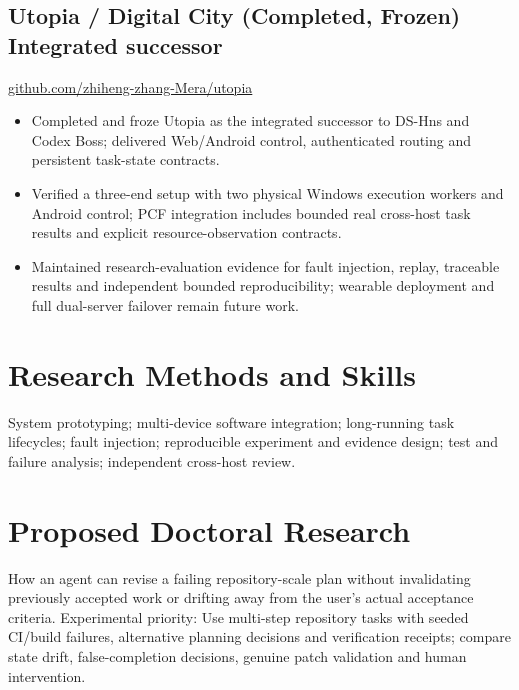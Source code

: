 \documentclass[10pt,a4paper]{article}
\begin{document}
\subsection*{Utopia / Digital City (Completed, Frozen) \hfill \small Integrated successor}
\href{https://github.com/zhiheng-zhang-Mera/utopia}{github.com/zhiheng-zhang-Mera/utopia}
\begin{itemize}
\item Completed and froze Utopia as the integrated successor to DS-Hns and Codex Boss; delivered Web/Android control, authenticated routing and persistent task-state contracts.
\item Verified a three-end setup with two physical Windows execution workers and Android control; PCF integration includes bounded real cross-host task results and explicit resource-observation contracts.
\item Maintained research-evaluation evidence for fault injection, replay, traceable results and independent bounded reproducibility; wearable deployment and full dual-server failover remain future work.
\end{itemize}

\section{Research Methods and Skills}
System prototyping; multi-device software integration; long-running task lifecycles; fault injection; reproducible experiment and evidence design; test and failure analysis; independent cross-host review.

\section{Proposed Doctoral Research}
How an agent can revise a failing repository-scale plan without invalidating previously accepted work or drifting away from the user's actual acceptance criteria. Experimental priority: Use multi-step repository tasks with seeded CI/build failures, alternative planning decisions and verification receipts; compare state drift, false-completion decisions, genuine patch validation and human intervention.

\par\smallskip{}
\end{document}
